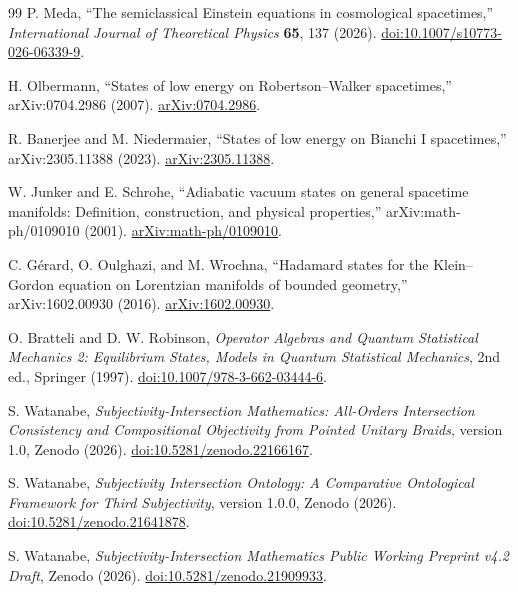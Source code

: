 \documentclass[11pt]{article}
\theoremstyle{definition}
\theoremstyle{remark}
\begin{document}
\begin{thebibliography}{99}
P. Meda, ``The semiclassical Einstein equations in cosmological spacetimes,'' \emph{International Journal of Theoretical Physics} \textbf{65}, 137 (2026). \href{https://doi.org/10.1007/s10773-026-06339-9}{doi:10.1007/s10773-026-06339-9}.

H. Olbermann, ``States of low energy on Robertson--Walker spacetimes,'' arXiv:0704.2986 (2007). \href{https://arxiv.org/abs/0704.2986}{arXiv:0704.2986}.

R. Banerjee and M. Niedermaier, ``States of low energy on Bianchi I spacetimes,'' arXiv:2305.11388 (2023). \href{https://arxiv.org/abs/2305.11388}{arXiv:2305.11388}.

W. Junker and E. Schrohe, ``Adiabatic vacuum states on general spacetime manifolds: Definition, construction, and physical properties,'' arXiv:math-ph/0109010 (2001). \href{https://arxiv.org/abs/math-ph/0109010}{arXiv:math-ph/0109010}.

C. G\'erard, O. Oulghazi, and M. Wrochna, ``Hadamard states for the Klein--Gordon equation on Lorentzian manifolds of bounded geometry,'' arXiv:1602.00930 (2016). \href{https://arxiv.org/abs/1602.00930}{arXiv:1602.00930}.

O. Bratteli and D. W. Robinson, \emph{Operator Algebras and Quantum Statistical Mechanics 2: Equilibrium States, Models in Quantum Statistical Mechanics}, 2nd ed., Springer (1997). \href{https://doi.org/10.1007/978-3-662-03444-6}{doi:10.1007/978-3-662-03444-6}.

S. Watanabe, \emph{Subjectivity-Intersection Mathematics: All-Orders Intersection Consistency and Compositional Objectivity from Pointed Unitary Braids}, version 1.0, Zenodo (2026). \href{https://doi.org/10.5281/zenodo.22166167}{doi:10.5281/zenodo.22166167}.

S. Watanabe, \emph{Subjectivity Intersection Ontology: A Comparative Ontological Framework for Third Subjectivity}, version 1.0.0, Zenodo (2026). \href{https://doi.org/10.5281/zenodo.21641878}{doi:10.5281/zenodo.21641878}.

S. Watanabe, \emph{Subjectivity-Intersection Mathematics Public Working Preprint v4.2 Draft}, Zenodo (2026). \href{https://doi.org/10.5281/zenodo.21909933}{doi:10.5281/zenodo.21909933}.

\end{thebibliography}
\end{document}
